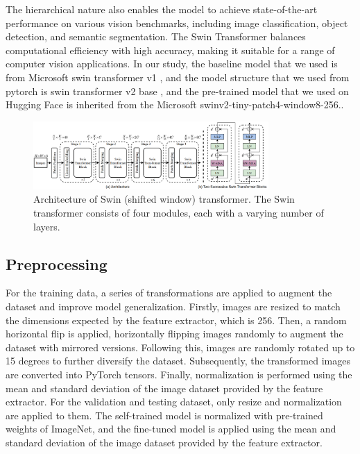 \documentclass{article}
\begin{document}
The hierarchical nature also enables the model to achieve state-of-the-art performance on various vision benchmarks, including image classification, object detection, and semantic segmentation. The Swin Transformer balances computational efficiency with high accuracy, making it suitable for a range of computer vision applications. In our study, the baseline model that we used is from Microsoft swin transformer v1 \cite{liu2021swin}, and the model structure that we used from pytorch is swin transformer v2 base \cite{liu2022swin}, and the pre-trained model that we used on Hugging Face is inherited from the Microsoft swinv2-tiny-patch4-window8-256.\cite{liu2022swin}.

\begin{figure}[!htb]
  \centering
  \includegraphics[width=0.8\textwidth]{swin_transformer.png}
  \caption{Architecture of Swin (shifted window) transformer. The Swin transformer consists of four modules, each with a varying number of layers.}
\end{figure}

\subsection{Preprocessing}
For the training data, a series of transformations are applied to augment the dataset and improve model generalization. Firstly, images are resized to match the dimensions expected by the feature extractor, which is 256. Then, a random horizontal flip is applied, horizontally flipping images randomly to augment the dataset with mirrored versions. Following this, images are randomly rotated up to 15 degrees to further diversify the dataset. Subsequently, the transformed images are converted into PyTorch tensors. Finally, normalization is performed using the mean and standard deviation of the image dataset provided by the feature extractor. For the validation and testing dataset, only resize and normalization are applied to them. The self-trained model is normalized with pre-trained weights of ImageNet, and the fine-tuned model is applied using the mean and standard deviation of the image dataset provided by the feature extractor.
\end{document}
